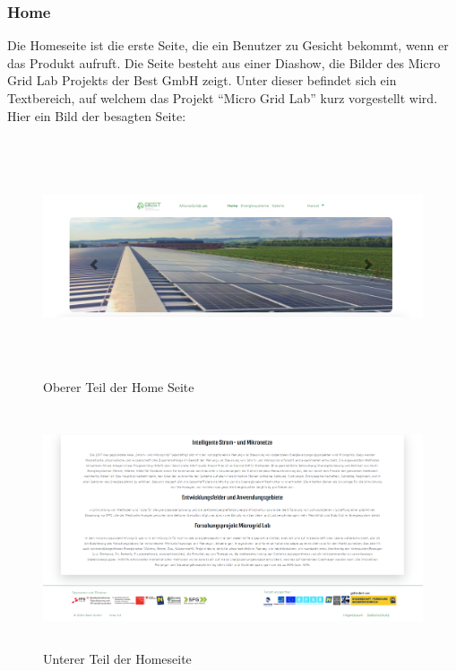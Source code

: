 \subsubsection{Home}
Die Homeseite ist die erste Seite, die ein Benutzer zu Gesicht bekommt, wenn er das Produkt aufruft. Die Seite besteht aus einer Diashow, die Bilder des Micro Grid Lab Projekts der Best GmbH zeigt. Unter dieser befindet sich ein Textbereich, auf welchem das Projekt “Micro Grid Lab” kurz vorgestellt wird. Hier ein Bild der besagten Seite:
\begin{figure}[h]
	\centering
	\includegraphics[height=7cm,width=14cm]{images/HomeSeite1}
	\caption{Oberer Teil der Home Seite}
	\label{fig:HomeSeite1}
\end{figure}
\begin{figure}[h]
	\centering
	\includegraphics[height=7cm,width=14cm]{images/HomeSeite2}
	\caption{Unterer Teil der Homeseite}
	\label{fig:HomeSeite1}
\end{figure}
\newpage
